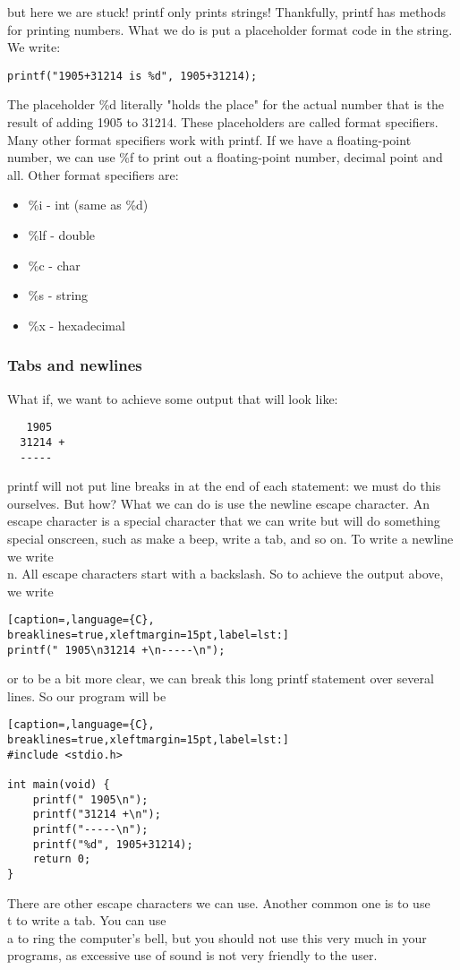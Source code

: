 but here we are stuck! printf only prints strings! Thankfully, printf has
methods for printing numbers. What we do is put a placeholder format code in
the string. We write:
\scriptsize
\begin{verbatim}
printf("1905+31214 is %d", 1905+31214);
\end{verbatim}
\normalsize

The placeholder \%d literally "holds the place" for the actual number that is
the result of adding 1905 to 31214.  These placeholders are called format
specifiers. Many other format specifiers work with printf. If we have a
floating-point number, we can use \%f to print out a floating-point number,
decimal point and all. Other format specifiers are:
\begin{itemize}
\item \%i - int (same as \%d)
\item \%lf - double
\item \%c - char
\item \%s - string
\item \%x - hexadecimal
\end{itemize}

\subsubsection{Tabs and newlines}
What if, we want to achieve some output that will look like:
\scriptsize
\begin{verbatim}
   1905 
  31214 +
  -----
\end{verbatim}
\normalsize

printf will not put line breaks in at the end of each statement: we must do
this ourselves. But how?  What we can do is use the newline escape character.
An escape character is a special character that we can write but will do
something special onscreen, such as make a beep, write a tab, and so on. To
write a newline we write \\n. All escape characters start with a backslash.  So
to achieve the output above, we write
\lstset{basicstyle=\scriptsize, numbers=left, captionpos=b, tabsize=4}
\begin{lstlisting}[caption=,language={C},
breaklines=true,xleftmargin=15pt,label=lst:]
printf(" 1905\n31214 +\n-----\n");
\end{lstlisting}

or to be a bit more clear, we can break this long printf statement over several
lines. So our program will be
\lstset{basicstyle=\scriptsize, numbers=left, captionpos=b, tabsize=4}
\begin{lstlisting}[caption=,language={C},
breaklines=true,xleftmargin=15pt,label=lst:]
#include <stdio.h>
 
int main(void) {
	printf(" 1905\n");
	printf("31214 +\n");
	printf("-----\n");
	printf("%d", 1905+31214);
	return 0;
}
\end{lstlisting}
There are other escape characters we can use. Another common one is to use \\t
to write a tab. You can use \\a to ring the computer's bell, but you should not
use this very much in your programs, as excessive use of sound is not very
friendly to the user.

